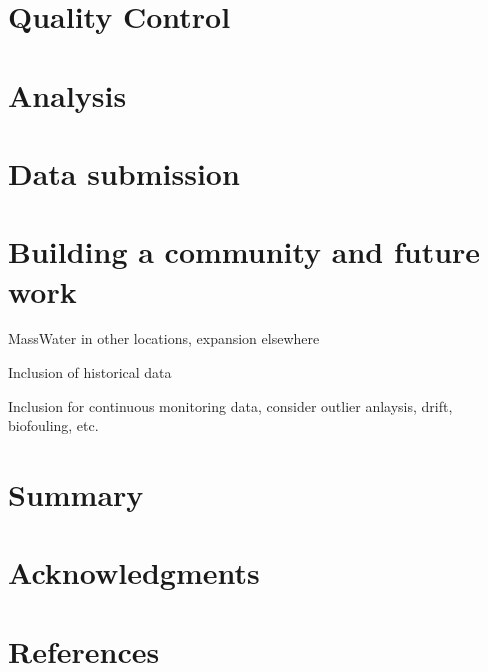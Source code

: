\hypertarget{quality-control}{%
\section{Quality Control}\label{quality-control}}

\hypertarget{analysis}{%
\section{Analysis}\label{analysis}}

\hypertarget{data-submission}{%
\section{Data submission}\label{data-submission}}

\hypertarget{building-a-community-and-future-work}{%
\section{Building a community and future work}\label{building-a-community-and-future-work}}

MassWater in other locations, expansion elsewhere

Inclusion of historical data

Inclusion for continuous monitoring data, consider outlier anlaysis, drift, biofouling, etc.

\hypertarget{summary}{%
\section{Summary}\label{summary}}

\hypertarget{acknowledgments}{%
\section{Acknowledgments}\label{acknowledgments}}

\hypertarget{references}{%
\section{References}\label{references}}



\address{%
Marcus W. Beck\\
Tampa Bay Estuary Program\\%
263 13th Ave S\\ St.~Petersburg, Florida, USA 33701\\
%
\url{https://tbep.org}\\%
\textit{ORCiD: \href{https://orcid.org/0000-0002-4996-0059}{0000-0002-4996-0059}}\\%
\href{mailto:mbeck@tbep.org}{\nolinkurl{mbeck@tbep.org}}%
}

